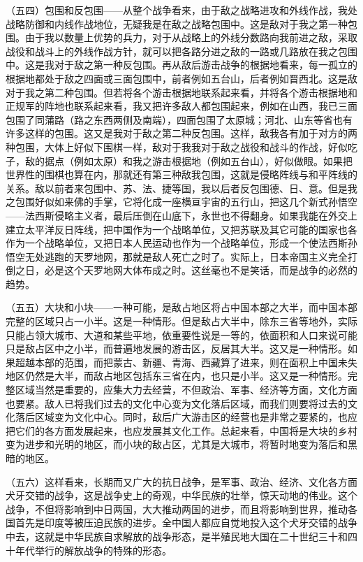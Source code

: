 （五四）包围和反包围——从整个战争看来，由于敌之战略进攻和外线作战，我处战略防御和内线作战地位，无疑我是在敌之战略包围中。这是敌对于我之第一种包围。由于我以数量上优势的兵力，对于从战略上的外线分数路向我前进之敌，采取战役和战斗上的外线作战方针，就可以把各路分进之敌的一路或几路放在我之包围中。这是我对于敌之第一种反包围。再从敌后游击战争的根据地看来，每一孤立的根据地都处于敌之四面或三面包围中，前者例如五台山，后者例如晋西北。这是敌对于我之第二种包围。但若将各个游击根据地联系起来看，并将各个游击根据地和正规军的阵地也联系起来看，我又把许多敌人都包围起来，例如在山西，我已三面包围了同蒲路（路之东西两侧及南端），四面包围了太原城；河北、山东等省也有许多这样的包围。这又是我对于敌之第二种反包围。这样，敌我各有加于对方的两种包围，大体上好似下围棋一样，敌对于我我对于敌之战役和战斗的作战，好似吃子，敌的据点（例如太原）和我之游击根据地（例如五台山），好似做眼。如果把世界性的围棋也算在内，那就还有第三种敌我包围，这就是侵略阵线与和平阵线的关系。敌以前者来包围中、苏、法、捷等国，我以后者反包围德、日、意。但是我之包围好似如来佛的手掌，它将化成一座横亘宇宙的五行山，把这几个新式孙悟空——法西斯侵略主义者，最后压倒在山底下，永世也不得翻身。如果我能在外交上建立太平洋反日阵线，把中国作为一个战略单位，又把苏联及其它可能的国家也各作为一个战略单位，又把日本人民运动也作为一个战略单位，形成一个使法西斯孙悟空无处逃跑的天罗地网，那就是敌人死亡之时了。实际上，日本帝国主义完全打倒之日，必是这个天罗地网大体布成之时。这丝毫也不是笑话，而是战争的必然的趋势。

（五五）大块和小块——一种可能，是敌占地区将占中国本部之大半，而中国本部完整的区域只占一小半。这是一种情形。但是敌占大半中，除东三省等地外，实际只能占领大城市、大道和某些平地，依重要性说是一等的，依面积和人口来说可能只是敌占区中之小半，而普遍地发展的游击区，反居其大半。这又是一种情形。如果超越本部的范围，而把蒙古、新疆、青海、西藏算了进来，则在面积上中国未失地区仍然是大半，而敌占地区包括东三省在内，也只是小半。这又是一种情形。完整区域当然是重要的，应集大力去经营，不但政治、军事、经济等方面，文化方面也要紧。敌人已将我们过去的文化中心变为文化落后区域，而我们则要将过去的文化落后区域变为文化中心。同时，敌后广大游击区的经营也是非常之要紧的，也应把它们的各方面发展起来，也应发展其文化工作。总起来看，中国将是大块的乡村变为进步和光明的地区，而小块的敌占区，尤其是大城市，将暂时地变为落后和黑暗的地区。

（五六）这样看来，长期而又广大的抗日战争，是军事、政治、经济、文化各方面犬牙交错的战争，这是战争史上的奇观，中华民族的壮举，惊天动地的伟业。这个战争，不但将影响到中日两国，大大推动两国的进步，而且将影响到世界，推动各国首先是印度等被压迫民族的进步。全中国人都应自觉地投入这个犬牙交错的战争中去，这就是中华民族自求解放的战争形态，是半殖民地大国在二十世纪三十和四十年代举行的解放战争的特殊的形态。

